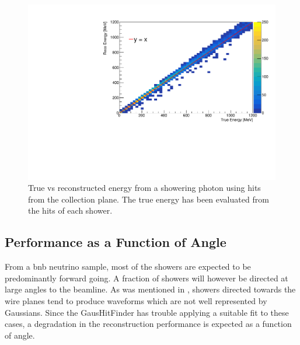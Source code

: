 \begin{figure}
    \centering
    \includegraphics[width = \largefigwidth]{figures-chap4/true_vs_reco_photon_ESTAR.pdf}
    \caption[True vs reconstructed energy from a showering photon. The true energy has been evaluated from the hits of each shower.]{True vs reconstructed energy from a showering photon using hits from the collection plane. The true energy has been evaluated from the hits of each shower.}
    \label{fig:true_vs_reco_photon_sample}
\end{figure}

\clearpage
\subsection{Performance as a Function of Angle}

From a \gls{bnb} neutrino sample, most of the showers are expected to be predominantly forward going. A fraction of showers will however be directed at large angles to the beamline. As was mentioned in , showers directed towards the wire planes tend to produce waveforms which are not well represented by Gaussians. Since the GausHitFinder has trouble applying a suitable fit to these cases, a degradation in the reconstruction performance is expected as a function of angle.

